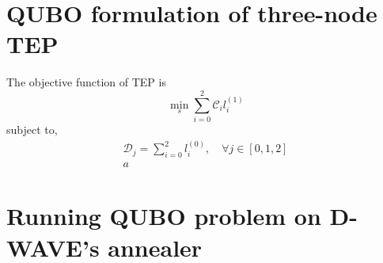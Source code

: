 \section{QUBO formulation of three-node TEP}
The objective function of TEP is
\begin{equation}
    \min_{s}\sum_{i=0}^{2}\mathcal{C}_{i}l_{i}^{(1)}
\end{equation}
subject to,
\begin{align}
    \mathcal{D}_{j} = \sum_{i=0}^{2}l_{i}^{(0)}, \quad \forall j \in \left[0,1,2\right] \\
    a
\end{align}
\section{Running QUBO problem on D-WAVE's annealer}

